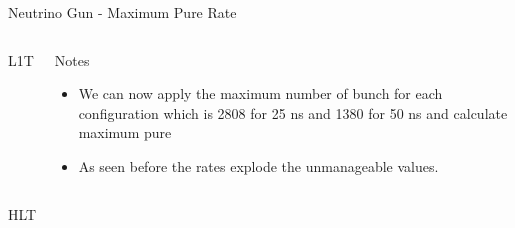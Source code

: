 \documentclass[8pt]{beamer}
\begin{document}
\begin{frame}{Neutrino Gun - Maximum Pure Rate}

\begin{columns}

\begin{block}{L1T}
\centering

\resizebox{1.0\linewidth}{!}{

}

\end{block}

\begin{block}{Notes}
 
\begin{itemize}
  \item We can now apply the maximum number of bunch for each configuration which is 2808 for 25 ns and 1380 for 50 ns and calculate maximum pure 
  \item As seen before the rates explode the unmanageable values.
\end{itemize}
 
\end{block}

\end{columns}

\begin{block}{HLT}
\centering

\resizebox{0.8\linewidth}{!}{}

\end{block}

\end{frame}
\end{document}
